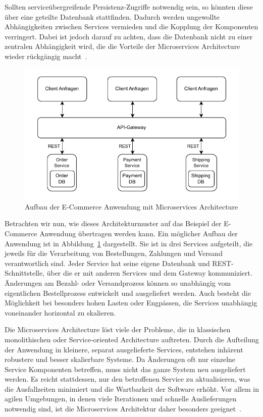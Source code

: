 \documentclass[acmtog]{acmart}
\begin{document}
Sollten serviceübergreifende Persistenz-Zugriffe notwendig sein, so könnten diese über eine geteilte Datenbank stattfinden.
Dadurch werden ungewollte Abhängigkeiten zwischen Services vermieden und die Kopplung der Komponenten verringert.
Dabei ist jedoch darauf zu achten, dass die Datenbank nicht zu einer zentralen Abhängigkeit wird, die die Vorteile der Microservices Architecture wieder rückgängig macht~\cite[33]{architecturePatterns}.

\begin{figure}[!h]
  \centering
  \includegraphics[width=\linewidth]{images/microservices/ecommerce-microservices}
  \caption{Aufbau der E-Commerce Anwendung mit Microservices Architecture}
  \label{fig:ecommerce-microservices}
\end{figure}

Betrachten wir nun, wie dieses Architekturmuster auf das Beispiel der E-Commerce Anwendung übertragen werden kann.
Ein möglicher Aufbau der Anwendung ist in Abbildung~\ref{fig:ecommerce-microservices} dargestellt.
Sie ist in drei Services aufgeteilt, die jeweils für die Verarbeitung von Bestellungen, Zahlungen und Versand verantwortlich sind.
Jeder Service hat seine eigene Datenbank und REST-Schnittstelle, über die er mit anderen Services und dem Gateway kommuniziert.
Änderungen am Bezahl- oder Versandprozess können so unabhängig vom eigentlichen Bestellprozess entwickelt und ausgeliefert werden.
Auch besteht die Möglichkeit bei besonders hohen Lasten oder Engpässen, die Services unabhängig voneinander horizontal zu skalieren.

Die Microservices Architecture löst viele der Probleme, die in klassischen monolithischen oder Service-oriented Architecture auftreten.
Durch die Aufteilung der Anwendung in kleinere, separat ausgelieferte Services, entstehen inhärent robustere und besser skalierbare Systeme.
Da Änderungen oft nur einzelne Service Komponenten betreffen, muss nicht das ganze System neu ausgeliefert werden.
Es reicht stattdessen, nur den betroffenen Service zu aktualisieren, was die Ausfallzeiten minimiert und die Wartbarkeit der Software erhöht.
Vor allem in agilen Umgebungen, in denen viele Iterationen und schnelle Auslieferungen notwendig sind, ist die Microservices Architektur daher besonders geeignet~\cite[33]{architecturePatterns}.
\end{document}
